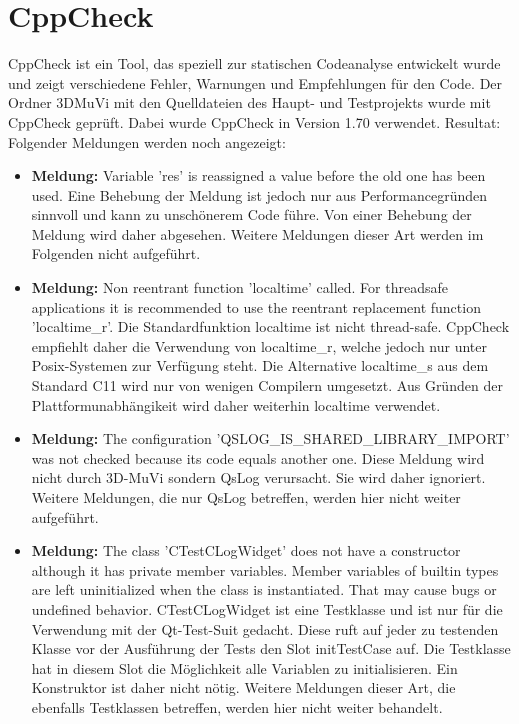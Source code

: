 \section{CppCheck}
CppCheck ist ein Tool, das speziell zur statischen Codeanalyse entwickelt wurde und zeigt verschiedene Fehler, Warnungen und Empfehlungen für den Code. Der Ordner 3DMuVi mit den Quelldateien des Haupt- und Testprojekts wurde mit CppCheck geprüft. Dabei wurde CppCheck in Version 1.70 verwendet.
Resultat: Folgender Meldungen werden noch angezeigt:
\begin{itemize}
\item \textbf{Meldung:} Variable 'res' is reassigned a value before the old one has been used.\newline
Eine Behebung der Meldung ist jedoch nur aus Performancegründen sinnvoll und kann zu unschönerem Code führe. Von einer Behebung der Meldung wird daher abgesehen. Weitere Meldungen dieser Art werden im Folgenden nicht aufgeführt.
\item \textbf{Meldung:} Non reentrant function 'localtime' called. For threadsafe applications it is recommended to use the reentrant replacement function 'localtime\_r'.\newline
Die Standardfunktion localtime ist nicht thread-safe. CppCheck empfiehlt daher die Verwendung von localtime\_r, welche jedoch nur unter Posix-Systemen zur Verfügung steht. Die Alternative localtime\_s aus dem Standard C11 wird nur von wenigen Compilern umgesetzt. Aus Gründen der Plattformunabhängikeit wird daher weiterhin localtime verwendet.
\item \textbf{Meldung:} The configuration 'QSLOG\_IS\_SHARED\_LIBRARY\_IMPORT' was not checked because its code equals another one.\newline
Diese Meldung wird nicht durch 3D-MuVi sondern QsLog verursacht. Sie wird daher ignoriert. Weitere Meldungen, die nur QsLog betreffen, werden hier nicht weiter aufgeführt.
\item \textbf{Meldung:} The class 'CTestCLogWidget' does not have a constructor although it has private member variables. Member variables of builtin types are left uninitialized when the class is instantiated. That may cause bugs or undefined behavior.\newline
CTestCLogWidget ist eine Testklasse und ist nur für die Verwendung mit der Qt-Test-Suit gedacht. Diese ruft auf jeder zu testenden Klasse vor der Ausführung der Tests den Slot initTestCase auf. Die Testklasse hat in diesem Slot die Möglichkeit alle Variablen zu initialisieren. Ein Konstruktor ist daher nicht nötig. Weitere Meldungen dieser Art, die ebenfalls Testklassen betreffen, werden hier nicht weiter behandelt.
\end{itemize}
